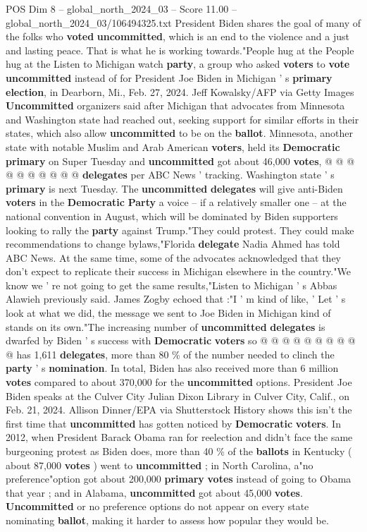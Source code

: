 \begin{textsample}{POS Dim 8 – global\_north\_2024\_03 – Score 11.00 – global\_north\_2024\_03/106494325.txt}
President Biden shares the goal of many of the folks who \textbf{voted} \textbf{uncommitted}, which is an end to the violence and a just and lasting peace.
That is what he is working towards."People hug at the People hug at the Listen to Michigan watch \textbf{party}, a group who asked \textbf{voters} to \textbf{vote} \textbf{uncommitted} instead of for President Joe Biden in Michigan ' s \textbf{primary} \textbf{election}, in Dearborn, Mi., Feb. 27, 2024.
Jeff Kowalsky/AFP via Getty Images \textbf{Uncommitted} organizers said after Michigan that advocates from Minnesota and Washington state had reached out, seeking support for similar efforts in their states, which also allow \textbf{uncommitted} to be on the \textbf{ballot}.
Minnesota, another state with notable Muslim and Arab American \textbf{voters}, held its \textbf{Democratic} \textbf{primary} on Super Tuesday and \textbf{uncommitted} got about 46,000 \textbf{votes}, @ @ @ @ @ @ @ @ @ @ \textbf{delegates} per ABC News ' tracking.
Washington state ' s \textbf{primary} is next Tuesday.
The \textbf{uncommitted} \textbf{delegates} will give anti-Biden \textbf{voters} in the \textbf{Democratic} \textbf{Party} a voice -- if a relatively smaller one -- at the national convention in August, which will be dominated by Biden supporters looking to rally the \textbf{party} against Trump."They could protest.
They could make recommendations to change bylaws,"Florida \textbf{delegate} Nadia Ahmed has told ABC News.
At the same time, some of the advocates acknowledged that they don't expect to replicate their success in Michigan elsewhere in the country."We know we ' re not going to get the same results,"Listen to Michigan ' s Abbas Alawieh previously said.
James Zogby echoed that :"I ' m kind of like, ' Let ' s look at what we did, the message we sent to Joe Biden in Michigan kind of stands on its own."The increasing number of \textbf{uncommitted} \textbf{delegates} is dwarfed by Biden ' s success with \textbf{Democratic} \textbf{voters} so @ @ @ @ @ @ @ @ @ @ has 1,611 \textbf{delegates}, more than 80 \% of the number needed to clinch the \textbf{party} ' s \textbf{nomination}.
In total, Biden has also received more than 6 million \textbf{votes} compared to about 370,000 for the \textbf{uncommitted} options.
President Joe Biden speaks at the Culver City Julian Dixon Library in Culver City, Calif., on Feb. 21, 2024.
Allison Dinner/EPA via Shutterstock History shows this isn't the first time that \textbf{uncommitted} has gotten noticed by \textbf{Democratic} \textbf{voters}.
In 2012, when President Barack Obama ran for reelection and didn't face the same burgeoning protest as Biden does, more than 40 \% of the \textbf{ballots} in Kentucky ( about 87,000 \textbf{votes} ) went to \textbf{uncommitted} ; in North Carolina, a"no preference"option got about 200,000 \textbf{primary} \textbf{votes} instead of going to Obama that year ; and in Alabama, \textbf{uncommitted} got about 45,000 \textbf{votes}. \textbf{Uncommitted} or no preference options do not appear on every state nominating \textbf{ballot}, making it harder to assess how popular they would be.

\end{textsample}
